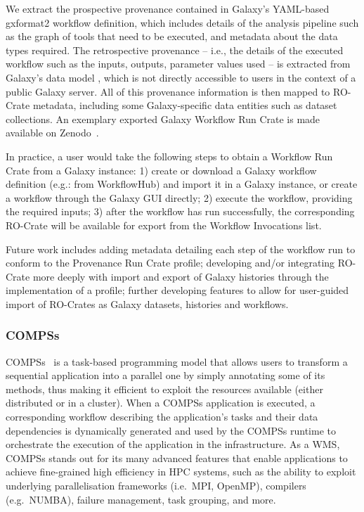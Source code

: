 We extract the prospective provenance contained in Galaxy's YAML-based gxformat2
 workflow definition, which includes details of the analysis pipeline such as the graph of tools that need to be executed, and metadata about the data types required.
The retrospective provenance -- i.e., the details of the executed workflow such as the inputs, outputs, parameter values used -- is extracted from Galaxy's data model , which is not directly accessible to users in the context of a public Galaxy server.
All of this provenance information is then mapped to RO-Crate metadata, including some Galaxy-specific data entities such as dataset collections.
An exemplary exported Galaxy Workflow Run Crate is made available on Zenodo~\cite{De Geest 2023b}.

In practice, a user would take the following steps to obtain a Workflow Run Crate from a Galaxy instance: 1) create or download a Galaxy workflow definition (e.g.: from WorkflowHub) and import it in a Galaxy instance, or create a workflow through the Galaxy GUI directly; 2) execute the workflow, providing the required inputs; 3) after the workflow has run successfully, the corresponding RO-Crate will be available for export from the Workflow Invocations list.

Future work includes adding metadata detailing each step of the workflow run to conform to the Provenance Run Crate profile; developing and/or integrating RO-Crate more deeply with import and export of Galaxy histories through the implementation of a profile; further developing features to allow for user-guided import of RO-Crates as Galaxy datasets, histories and workflows.

\subsubsection{COMPSs}\label{ch54:compss}

COMPSs~\cite{Lordan 2014} is a task-based programming model that allows users to transform a sequential application into a parallel one by simply annotating some of its methods, thus making it efficient to exploit the resources available (either distributed or in a cluster).
When a COMPSs application is executed, a corresponding workflow describing the application's tasks and their data dependencies is dynamically generated and used by the COMPSs runtime to orchestrate the execution of the application in the infrastructure.
As a WMS, COMPSs stands out for its many advanced features that enable applications to achieve fine-grained high efficiency in HPC systems, such as the ability to exploit underlying parallelisation frameworks (i.e.~MPI, OpenMP), compilers (e.g.~NUMBA), failure management, task grouping, and more.

